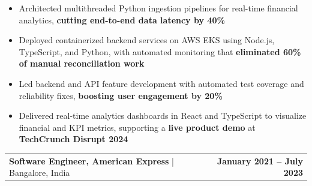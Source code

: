 \documentclass[10pt, letterpaper]{article}
\newenvironment{highlights}{
    \begin{itemize}[
        topsep=0.06 cm,
        parsep=0.06 cm,
        partopsep=0pt,
        itemsep=0pt,
        leftmargin=0 cm + 10pt
    ]
}{
    \end{itemize}
}
\newenvironment{onecolentry}{
    \par\noindent
}{
    \par
}
\begin{document}
\begin{onecolentry}
    \begin{highlights}

        \item[--] Architected multithreaded Python ingestion pipelines for real-time financial analytics, \textbf{cutting end-to-end data latency by 40\%}
        \item[--] Deployed containerized backend services on AWS EKS using Node.js, TypeScript, and Python, with automated monitoring that \textbf{eliminated 60\% of manual reconciliation work}
        \item[--] Led backend and API feature development with automated test coverage and reliability fixes, \textbf{boosting user engagement by 20\%}
        \item[--] Delivered real-time analytics dashboards in React and TypeScript to visualize financial and KPI metrics, supporting a \textbf{live product demo} at \textbf{TechCrunch Disrupt 2024}
    
    \end{highlights}
\end{onecolentry}

\vspace{0.0 cm}


\begin{tabularx}{\textwidth}{@{}Xr@{}}
    \textbf{Software Engineer, American Express} | Bangalore, India & \textbf{January 2021 – July 2023} \\
\end{tabularx}
\vspace{-4.5mm}
\end{document}
